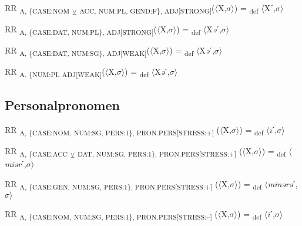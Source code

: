 {\begin{exe}
 RR \textsubscript{A, \{CASE:NOM} \textsubscript{${\veebar}$}\textsubscript{ ACC, NUM:PL, GEND:F\}, ADJ[STRONG]}($\langle$X,$\sigma $$\rangle$) = \textsubscript{def} $\langle$Xˊ,$\sigma $$\rangle$
\end{exe}

\begin{exe}
 RR \textsubscript{A, \{CASE:DAT, NUM:PL\}, ADJ[STRONG]}($\langle$X,$\sigma $$\rangle$) = \textsubscript{def} $\langle$X\textit{ə}ˊ,$\sigma $$\rangle$
\end{exe}

\begin{exe}
 RR \textsubscript{A, \{CASE:DAT, NUM:SG\}, ADJ[WEAK]}($\langle$X,$\sigma $$\rangle$) = \textsubscript{def} $\langle$X\textit{ə}ˊ,$\sigma $$\rangle$
\end{exe}

\begin{exe}
 RR \textsubscript{A, \{NUM:PL ADJ[WEAK]}($\langle$X,$\sigma $$\rangle$) = \textsubscript{def} $\langle$X\textit{ə}ˊ,$\sigma $$\rangle$
\end{exe}

\subsection{Personalpronomen}

\begin{exe}
 RR \textsubscript{A, \{CASE:NOM, NUM:SG, PERS:1\}, PRON.PERS[STRESS:+]} ($\langle$X,$\sigma $$\rangle$) = \textsubscript{def} $\langle$\textit{\=i}ˊ,$\sigma $$\rangle$
\end{exe}

\begin{exe}
 RR \textsubscript{A, \{CASE:ACC} \textsubscript{${\veebar}$}\textsubscript{ DAT, NUM:SG, PERS:1\}, PRON.PERS[STRESS:+]} ($\langle$X,$\sigma $$\rangle$) = \textsubscript{def} $\langle$\textit{miər}ˊ,$\sigma $$\rangle$
\end{exe}

\begin{exe}
 RR \textsubscript{A, \{CASE:GEN, NUM:SG, PERS:1\}, PRON.PERS[STRESS:+]} ($\langle$X,$\sigma $$\rangle$) = \textsubscript{def} $\langle$\textit{minərə}ˊ,$\sigma $$\rangle$
\end{exe}

\begin{exe}
 RR \textsubscript{A, \{CASE:NOM, NUM:SG, PERS:1\}, PRON.PERS[STRESS:–]} ($\langle$X,$\sigma $$\rangle$) = \textsubscript{def} $\langle$\textit{i}ˊ,$\sigma $$\rangle$
\end{exe}

}
